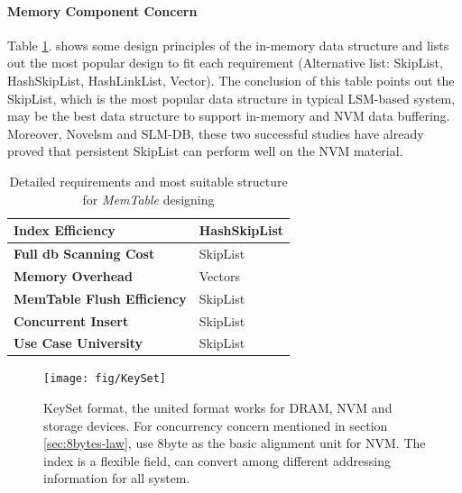 \paragraph{Memory Component Concern}
Table \ref{tab:memtable_requirment}. shows some design principles of the in-memory data structure and lists out the most popular design to fit each requirement\cite{MemTable29:online} (Alternative list: SkipList, HashSkipList, HashLinkList, Vector). The conclusion of this table points out the SkipList, which is the most popular data structure in typical LSM-based system, may be the best data structure to support in-memory and NVM data buffering. Moreover, Novelsm\cite{kannan2018redesigning} and SLM-DB\cite{kaiyrakhmet2019slm}, these two successful studies have already proved that persistent SkipList can perform well on the NVM material.
\begin{table}
	\centering
	\begin{tabular}{|p{}|p{}|}
		\hline
		\textbf{Index Efficiency} & HashSkipList \\ \hline
		\textbf{Full db Scanning Cost} & SkipList \\ \hline
		\textbf{Memory Overhead} & Vectors \\ \hline
		\textbf{MemTable Flush Efficiency} & SkipList \\ \hline
		\textbf{Concurrent Insert} & SkipList \\ \hline
		\textbf{Use Case University} & SkipList\\ \hline
	\end{tabular}
	\caption{Detailed requirements and most suitable structure for \textit{MemTable} designing}
	\label{tab:memtable_requirment}
\end{table}

\begin{figure}[t]
	\centering
	\texttt{[image: fig/KeySet]}
	\caption{KeySet format, the united format works for DRAM, NVM and storage devices. For concurrency concern mentioned in section \ref{sec:8bytes-law}, use 8byte as the basic alignment unit for NVM. The index is a flexible field, can convert among different addressing information for all system.}
	\label{fig:keyset}
\end{figure}


